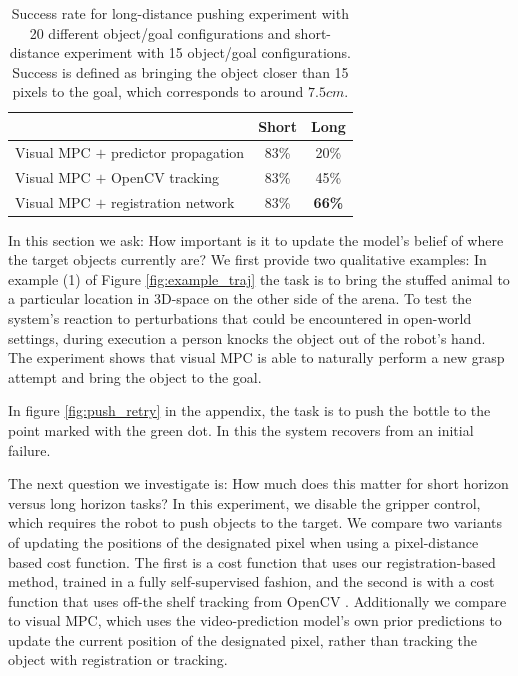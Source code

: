 \begin{table}
	{\footnotesize
		\begin{center}
			\begin{tabular}{lcc}
				\toprule
				& Short & Long \\
				\midrule
				Visual MPC $+$ predictor propagation  & 83\% & 20\% \\
				Visual MPC $+$ OpenCV tracking  & 83\%  & 45\% \\
				Visual MPC $+$ registration network & 83\% & \textbf{66\%}  \\
				\bottomrule
			\end{tabular}
		\end{center}
	}
	\caption{\small Success rate for long-distance pushing experiment with 20 different object/goal configurations and short-distance experiment with 15 object/goal configurations. Success is defined as bringing the object closer than 15 pixels to the goal, which corresponds to around $7.5cm$.}
	\label{table:res_long_short}
\end{table}
In this section we ask: How important  is it to update the model's belief of where the target objects currently are? 
We first provide two qualitative examples: In example (1) of Figure \ref{fig:example_traj}
the task is to bring the stuffed animal to a particular location in 3D-space on the other side of the arena. To test the system's reaction to perturbations that could be encountered in open-world settings, during execution a person knocks the object out of the robot's hand. The experiment shows that visual MPC is able to naturally perform a new grasp attempt and bring the object to the goal.

In figure \ref{fig:push_retry}
in the appendix, the task is to push the bottle to the point marked with the green dot. In this the system recovers from an initial failure.

The next question we investigate is: How much does this
matter for short horizon versus long horizon tasks? 
In this experiment, we disable the gripper control, which requires the robot to push objects to the target. We compare two variants of updating the positions of the designated pixel when using a pixel-distance based cost function. The first is a cost function that uses our registration-based method, trained in a fully self-supervised fashion, and the second is with a cost function that uses off-the shelf tracking from OpenCV \cite{babenko2009visual}. Additionally we compare to visual MPC,
which uses the video-prediction model's own prior predictions to update the current position of the designated pixel, rather than tracking the object with registration or tracking.

